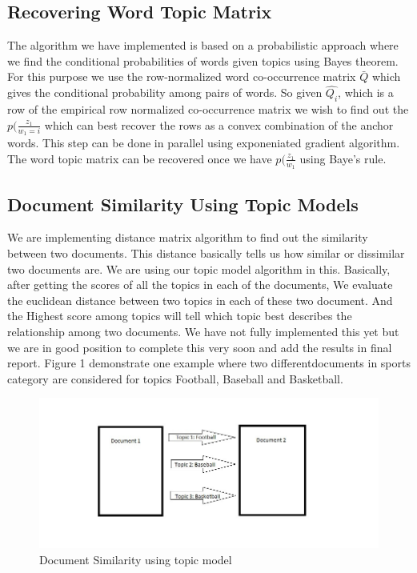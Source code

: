 \documentclass[a4paper,11pt]{article}
\begin{document}
\subsection{Recovering Word Topic Matrix}
The algorithm we have implemented is based on a probabilistic approach where we find the conditional probabilities of words given topics using Bayes theorem. For this purpose we use the row-normalized word co-occurrence matrix $\bar{Q}$ which gives the conditional probability among pairs of words. So given $\hat{Q_{i}}$, which is a row of the empirical row normalized co-occurrence matrix we wish to find out the $p(\frac{z_{1}}{w_{1}=i}$ which can best recover the rows as a convex combination of the anchor words. This step can be done in parallel using exponeniated gradient algorithm. The word topic matrix can be recovered once we have $p(\frac{z_{1}}{w_{1}}$ using Baye's rule. 

\subsection{Document Similarity Using Topic Models}
We are implementing distance matrix algorithm to find out the similarity between two documents. This distance basically tells us how similar or dissimilar two documents are. We are using our topic model algorithm in this. Basically, after getting the scores of all the topics in each of the documents, We evaluate the euclidean distance between two topics in each of these two document. And the Highest score among topics will tell which topic best describes the relationship among two documents. We have not fully implemented this yet but we are in good position to complete this very soon and add the results in final report. Figure 1 demonstrate one example where two differentdocuments in sports category are considered for topics Football, Baseball and Basketball. 



\begin{figure}[ht!]
\centering
\includegraphics[width=180mm]{document_similarity.jpg}
\caption{Document Similarity using topic model}
\label{overflow}
\end{figure}
\end{document}
